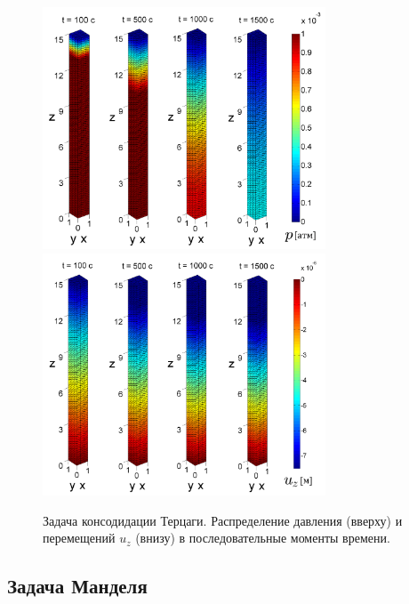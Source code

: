 \begin{figure}[t!]
\centering
\includegraphics[width=0.75\textwidth]{./figs/pp1Ter.png}\\
\includegraphics[width=0.75\textwidth]{./figs/uu1Ter.png}
\caption{ Задача консодидации Терцаги. Распределение давления (вверху) и перемещений $u_z$ (внизу) в 
последовательные моменты времени.}\label{fig:terpp}
\end{figure}
%
% 


\subsection{Задача Манделя}

